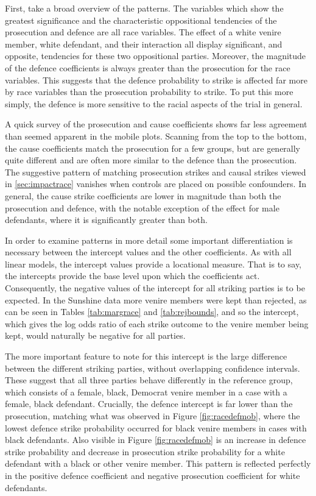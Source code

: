 First, take a broad overview of the patterns. The variables which show the greatest significance and the characteristic
oppositional tendencies of the prosecution and defence are all race variables. The effect of a white venire member, white
defendant, and their interaction all display significant, and opposite, tendencies for these two oppositional parties. Moreover,
the magnitude of the defence coefficients is always greater than the prosecution for the race variables. This suggests that the
defence probability to strike is affected far more by race variables than the prosecution probability to strike. To put this more
simply, the defence is more sensitive to the racial aspects of the trial in general.

A quick survey of the prosecution and cause coefficients shows far less agreement than seemed apparent in the mobile
plots. Scanning from the top to the bottom, the cause coefficients match the prosecution for a few groups, but are generally quite 
different and are often more similar to the defence than the prosecution. The suggestive pattern of matching prosecution strikes
and causal strikes viewed in \ref{sec:impactrace} vanishes when controls are placed on possible confounders. In general, the cause strike
coefficients are lower in magnitude than both the prosecution and defence, with the notable exception of the effect for male
defendants, where it is significantly greater than both.

In order to examine patterns in more detail some important differentiation is necessary between the intercept values and the other
coefficients. As with all linear models, the intercept values provide a locational measure. That is to say, the intercepts provide
the base level upon which the coefficients act. Consequently, the
negative values of the intercept for all striking parties is to
be expected. In the Sunshine data more venire members were kept than rejected, as can be seen in Tables \ref{tab:margrace} and
\ref{tab:rejbounds}, and so the intercept, which gives the log odds ratio of each strike outcome to the venire member being kept,
would naturally be negative for all parties.

The more important feature to note for this intercept is the large
difference between the different striking parties, without
overlapping confidence intervals. These suggest that all three parties behave differently in the reference group, which
consists of a female, black, Democrat venire member in a case with a female, black defendant. Crucially, the defence intercept is
far lower than the prosecution, matching what was observed in Figure \ref{fig:racedefmob}, where the lowest defence strike
probability occurred for black venire members in cases with black
defendants. Also visible in Figure \ref{fig:racedefmob} is an increase in
defence strike probability and decrease in prosecution strike probability for a white defendant with a black or other venire
member. This pattern is reflected perfectly in the positive defence coefficient and negative prosecution coefficient for white
defendants.

